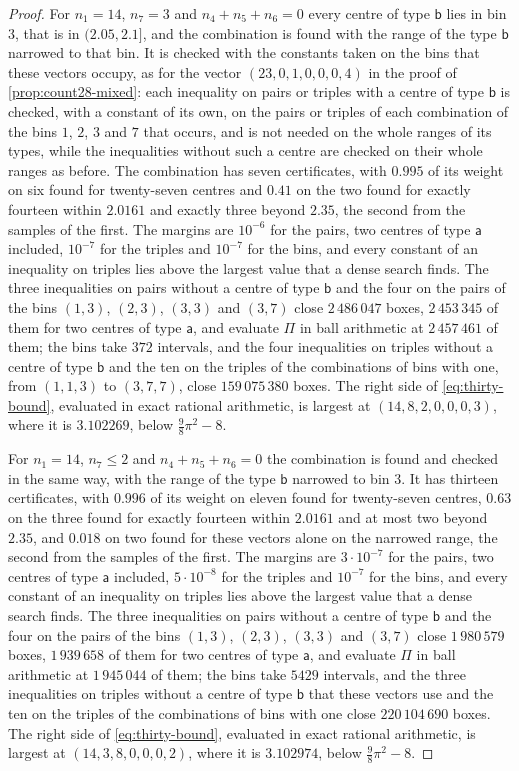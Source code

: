 \documentclass[11pt,reqno]{amsart}
\renewcommand{\_}{\origunderscore\allowbreak}
\numberwithin{equation}{section}
\theoremstyle{plain}
\theoremstyle{definition}
\theoremstyle{remark}
\begin{document}
\begin{proof}
For $n_1=14$, $n_7=3$ and $n_4+n_5+n_6=0$ every centre of type
$\mathsf b$ lies in bin $3$, that is in $(2.05,2.1]$, and the combination
is found with the range of the type $\mathsf b$ narrowed to that bin. It
is checked with the constants taken on the bins that these vectors occupy,
as for the vector $(23,0,1,0,0,0,4)$ in the proof of
\cref{prop:count28-mixed}: each inequality on pairs or triples with a
centre of type $\mathsf b$ is checked, with a constant of its own, on the
pairs or triples of each combination of the bins $1$, $2$, $3$ and $7$
that occurs, and is not needed on the whole ranges of its types, while the
inequalities without such a centre are checked on their whole ranges as
before. The combination has seven certificates, with $0.995$ of its
weight on six found for twenty-seven centres and $0.41$ on the two found
for exactly fourteen within $2.0161$ and exactly three beyond $2.35$, the
second from the samples of the first. The margins are $10^{-6}$ for the
pairs, two centres of type $\mathsf a$ included, $10^{-7}$ for the
triples and $10^{-7}$ for the bins, and every constant of an inequality on
triples lies above the largest value that a dense search finds. The three
inequalities on pairs without a centre of type $\mathsf b$ and the four on
the pairs of the bins $(1,3)$, $(2,3)$, $(3,3)$ and $(3,7)$ close
$2\,486\,047$ boxes, $2\,453\,345$ of them for two centres of type
$\mathsf a$, and evaluate $\Pi$ in ball arithmetic at $2\,457\,461$ of
them; the bins take $372$ intervals, and the four inequalities on triples
without a centre of type $\mathsf b$ and the ten on the triples of the
combinations of bins with one, from $(1,1,3)$ to $(3,7,7)$, close
$159\,075\,380$ boxes. The right side of \eqref{eq:thirty-bound},
evaluated in exact rational arithmetic, is largest at $(14,8,2,0,0,0,3)$,
where it is $3.102269$, below $\frac98\pi^2-8$.

For $n_1=14$, $n_7\le2$ and $n_4+n_5+n_6=0$ the combination is found and
checked in the same way, with the range of the type $\mathsf b$ narrowed to
bin $3$. It has thirteen certificates, with $0.996$ of its weight on eleven
found for twenty-seven centres, $0.63$ on the three found for exactly
fourteen within $2.0161$ and at most two beyond $2.35$, and $0.018$ on two
found for these vectors alone on the narrowed range, the second from the
samples of the first. The margins are $3\cdot10^{-7}$ for the pairs, two
centres of type $\mathsf a$ included, $5\cdot10^{-8}$ for the triples and
$10^{-7}$ for the bins, and every constant of an inequality on triples lies
above the largest value that a dense search finds. The three inequalities
on pairs without a centre of type $\mathsf b$ and the four on the pairs of
the bins $(1,3)$, $(2,3)$, $(3,3)$ and $(3,7)$ close $1\,980\,579$ boxes,
$1\,939\,658$ of them for two centres of type $\mathsf a$, and evaluate
$\Pi$ in ball arithmetic at $1\,945\,044$ of them; the bins take $5429$
intervals, and the three inequalities on triples without a centre of type
$\mathsf b$ that these vectors use and the ten on the triples of the
combinations of bins with one close $220\,104\,690$ boxes. The right side
of \eqref{eq:thirty-bound}, evaluated in exact rational arithmetic, is
largest at $(14,3,8,0,0,0,2)$, where it is $3.102974$, below
$\frac98\pi^2-8$.


\end{proof}
\end{document}
